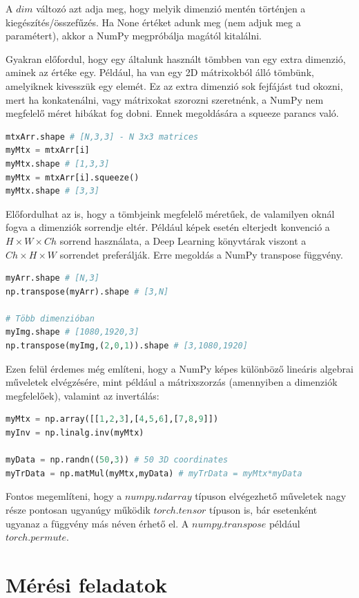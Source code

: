 \documentclass[12pt,a4paper,oneside]{report}             %
\begin{document}
A $dim$ változó azt adja meg, hogy melyik dimenzió mentén történjen a kiegészítés/összefűzés. Ha None értéket adunk meg (nem adjuk meg a paramétert), akkor a NumPy megpróbálja magától kitalálni.

Gyakran előfordul, hogy egy általunk használt tömbben van egy extra dimenzió, aminek az értéke egy. Például, ha van egy 2D mátrixokból álló tömbünk, amelyiknek kivesszük egy elemét. Ez az extra dimenzió sok fejfájást tud okozni, mert ha konkatenálni, vagy mátrixokat szorozni szeretnénk, a NumPy nem megfelelő méret hibákat fog dobni. Ennek megoldására a squeeze parancs való.

\begin{lstlisting}[language=Python]
mtxArr.shape # [N,3,3] - N 3x3 matrices
myMtx = mtxArr[i]
myMtx.shape # [1,3,3]
myMtx = mtxArr[i].squeeze()
myMtx.shape # [3,3]
\end{lstlisting}

Előfordulhat az is, hogy a tömbjeink megfelelő méretűek, de valamilyen oknál fogva a dimenziók sorrendje eltér. Például képek esetén elterjedt konvenció a $H\times W\times Ch$ sorrend használata, a Deep Learning könyvtárak viszont a $Ch\times H\times W$ sorrendet preferálják. Erre megoldás a NumPy transpose függvény.

\begin{lstlisting}[language=Python]
myArr.shape # [N,3]
np.transpose(myArr).shape # [3,N]

# Több dimenzióban
myImg.shape # [1080,1920,3]
np.transpose(myImg,(2,0,1)).shape # [3,1080,1920]
\end{lstlisting}

Ezen felül érdemes még említeni, hogy a NumPy képes különböző lineáris algebrai műveletek elvégzésére, mint például a mátrixszorzás (amennyiben a dimenziók megfelelőek), valamint az invertálás:

\begin{lstlisting}[language=Python]
myMtx = np.array([[1,2,3],[4,5,6],[7,8,9]])
myInv = np.linalg.inv(myMtx)

myData = np.randn((50,3)) # 50 3D coordinates
myTrData = np.matMul(myMtx,myData) # myTrData = myMtx*myData
\end{lstlisting}

Fontos megemlíteni, hogy a $numpy.ndarray$ típuson elvégezhető műveletek nagy része pontosan ugyanúgy működik $torch.tensor$ típuson is, bár esetenként ugyanaz a függvény más néven érhető el. A $numpy.transpose$ például $torch.permute$.

\chapter{Mérési feladatok}
\end{document}
